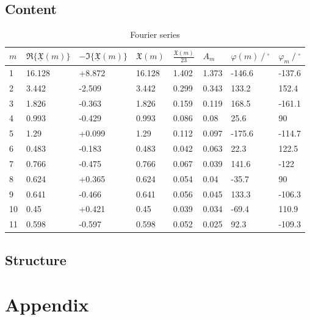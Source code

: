 \documentclass[12pt, a4paper]{article}
\begin{document}
\subsection{Content}
\begin{table}[H]
\centering
\begin{tabular}{@{}llllllll@{}} \toprule
    {\(m\)} & {\(\Re\{\underline{\mathfrak{X}}(m)\}\)} & {\(-\Im\{\underline{\mathfrak{X}}(m)\}\)} & {\(\mathfrak{X}(m)\)} & {\(\frac{\mathfrak{X}(m)}{23}\)} & {\(A_m\)} & {\(\varphi(m)\ /\ ^{\circ}\)} & {\(\varphi_m\ /\ ^{\circ}\)} \\ \midrule
    1  & 16.128 & +8.872 & 16.128 & 1.402 & 1.373 & -146.6 & -137.6 \\
    2  & 3.442  & -2.509 & 3.442  & 0.299 & 0.343 & 133.2  & 152.4  \\
    3  & 1.826  & -0.363 & 1.826  & 0.159 & 0.119 & 168.5  & -161.1 \\
    4  & 0.993  & -0.429 & 0.993  & 0.086 & 0.08  & 25.6   & 90     \\ \midrule
    5  & 1.29   & +0.099 & 1.29   & 0.112 & 0.097 & -175.6 & -114.7 \\
    6  & 0.483  & -0.183 & 0.483  & 0.042 & 0.063 & 22.3   & 122.5  \\
    7  & 0.766  & -0.475 & 0.766  & 0.067 & 0.039 & 141.6  & -122   \\
    8  & 0.624  & +0.365 & 0.624  & 0.054 & 0.04  & -35.7  & 90     \\ \midrule
    9  & 0.641  & -0.466 & 0.641  & 0.056 & 0.045 & 133.3  & -106.3 \\
    10 & 0.45   & +0.421 & 0.45   & 0.039 & 0.034 & -69.4  & 110.9  \\
    11 & 0.598  & -0.597 & 0.598  & 0.052 & 0.025 & 92.3   & -109.3 \\ \bottomrule
\end{tabular}
\caption{Fourier series}\label{tab::fourier}
\end{table}
\subsection{Structure}
\lipsum[35]
\newpage

\renewcommand{\thesubsection}{\Alph{subsection}}
\setcounter{page}{\value{lastroman}}
\section*{Appendix}


\newpage


\newpage
\listoffigures
\listoftables





\end{document}
